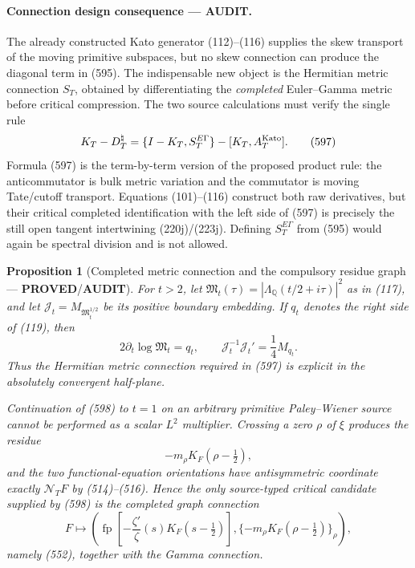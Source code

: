 \documentclass[11pt]{article}
\newtheorem{proposition}[theorem]{Proposition}
\newcommand{\PROVED}{\textcolor{green!45!black}{\textbf{PROVED}}}
\newcommand{\AUDIT}{\textcolor{orange!75!black}{\textbf{AUDIT}}}
\begin{document}
\paragraph{Connection design consequence --- \AUDIT.}
The already constructed Kato generator (112)--(116) supplies the skew
transport of the moving primitive subspaces, but no skew connection can
produce the diagonal term in (595).  The indispensable new object is the
Hermitian metric connection \(S_T\), obtained by differentiating the
\emph{completed} Euler--Gamma metric before critical compression.  The two
source calculations must verify the single rule
\begin{equation}
 K_T-D_T^\natural
 =\{I-K_T,S_T^{E\Gamma}\}
   -[K_T,A_T^{\rm Kato}] .                            \tag{597}
\end{equation}
Formula (597) is the term-by-term version of the proposed product rule:
the anticommutator is bulk metric variation and the commutator is moving
Tate/cutoff transport.  Equations (101)--(116) construct both raw
derivatives, but their critical completed identification with the left side
of (597) is precisely the still open tangent intertwining (220j)/(223j).
Defining \(S_T^{E\Gamma}\) from (595) would again be spectral division and
is not allowed.

\begin{proposition}[Completed metric connection and the compulsory residue
graph --- \PROVED/\AUDIT]
For \(t>2\), let
\(\mathfrak M_t(\tau)=
 |\Lambda_{\mathbb Q}(t/2+i\tau)|^2\) as in (117), and let
\(\mathcal J_t=M_{\mathfrak M_t^{1/2}}\) be its positive boundary
embedding.  If \(q_t\) denotes the right side of (119), then
\begin{equation}
 2\partial_t\log\mathfrak M_t=q_t,\qquad
 \mathcal J_t^{-1}\mathcal J_t'
 =\frac14M_{q_t}.                                     \tag{598}
\end{equation}
Thus the Hermitian metric connection required in (597) is explicit in the
absolutely convergent half-plane.

Continuation of (598) to \(t=1\) on an arbitrary primitive
Paley--Wiener source cannot be performed as a scalar \(L^2\) multiplier.
Crossing a zero \(\rho\) of \(\xi\) produces the residue
\begin{equation}
 -m_\rho K_F(\rho-\tfrac12),                          \tag{599}
\end{equation}
and the two functional-equation orientations have antisymmetric coordinate
exactly \(\mathcal N_TF\) by (514)--(516).  Hence the only source-typed
critical candidate supplied by (598) is the completed graph connection
\begin{equation}
 F\longmapsto
 \left(
  \operatorname{fp}\!\left[
   -\frac{\zeta'}{\zeta}(s)K_F(s-\tfrac12)\right],
  \{-m_\rho K_F(\rho-\tfrac12)\}_\rho
 \right),                                             \tag{600}
\end{equation}
namely (552), together with the Gamma connection.
\end{proposition}
\end{document}
